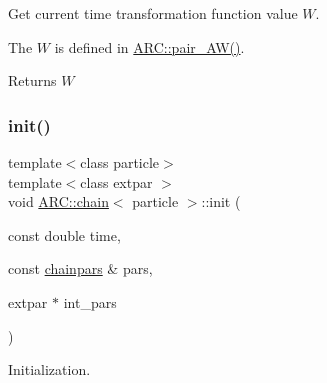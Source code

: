 Get current time transformation function value $W$. 

The $W$ is defined in \hyperlink{namespaceARC_a270b4c77765cacf073a5ef5f928f1d63}{A\+R\+C\+::pair\+\_\+\+A\+W()}. \begin{DoxyReturn}{Returns}
$W$ 
\end{DoxyReturn}
\hypertarget{classARC_1_1chain_a269690a2daece1dacb21a78e11b019a6}{}\label{classARC_1_1chain_a269690a2daece1dacb21a78e11b019a6} 
\subsubsection{\texorpdfstring{init()}{init()}}
{\footnotesize\ttfamily template$<$class particle$>$ \\
template$<$class extpar $>$ \\
void \hyperlink{classARC_1_1chain}{A\+R\+C\+::chain}$<$ particle $>$\+::init (\begin{DoxyParamCaption}\item[{const double}]{time,  }\item[{const \hyperlink{classARC_1_1chainpars}{chainpars} \&}]{pars,  }\item[{extpar $\ast$}]{int\+\_\+pars }\end{DoxyParamCaption})\hspace{0.3cm}{\ttfamily [inline]}}



Initialization. 

